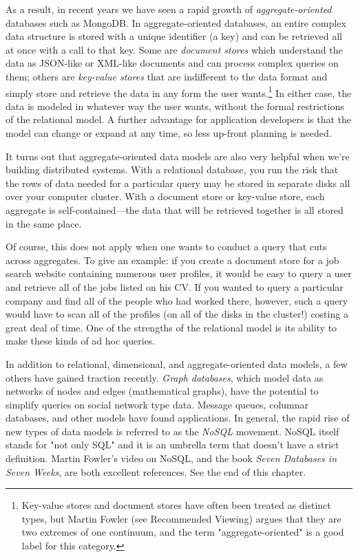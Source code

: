 \documentclass[11pt]{book}
\newcommand{\term}[1]{\emph{#1}} %
\begin{document}
As a result, in recent years we have seen a rapid growth of \term{aggregate-oriented} databases such as MongoDB.  In aggregate-oriented databases, an entire complex data structure is stored with a unique identifier (a key) and can be retrieved all at once with a call to that key.  Some are \term{document stores} which understand the data as JSON-like or XML-like documents and can process complex queries on them; others are \term{key-value stores} that are indifferent to the data format and simply store and retrieve the data in any form the user wants.\footnote{Key-value stores and document stores have often been treated as distinct types, but Martin Fowler (see Recommended Viewing) argues that they are two extremes of one continuum, and the term "aggregate-oriented" is a good label for this category.}  In either case, the data is modeled in whatever way the user wants, without the formal restrictions of the relational model.  A further advantage for application developers is that the model can change or expand at any time, so less up-front planning is needed.

It turns out that aggregate-oriented data models are also very helpful when we're building distributed systems.  With a relational database, you run the risk that the rows of data needed for a particular query may be stored in separate disks all over your computer cluster.  With a document store or key-value store, each aggregate is self-contained---the data that will be retrieved together is all stored in the same place.

Of course, this does not apply when one wants to conduct a query that cuts across aggregates.  To give an example: if you create a document store for a job search website containing numerous user profiles, it would be easy to query a user and retrieve all of the jobs listed on his CV.  If you wanted to query a particular company and find all of the people who had worked there, however, such a query would have to scan all of the profiles (on all of the disks in the cluster!) costing a great deal of time.  One of the strengths of the relational model is its ability to make these kinds of ad hoc queries.

In addition to relational, dimensional, and aggregate-oriented data models, a few others have gained traction recently.  \term{Graph databases}, which model data as networks of nodes and edges (mathematical graphs), have the potential to simplify queries on social network type data.  Message queues, columnar databases, and other models have found applications.  In general, the rapid rise of new types of data models is referred to as the \term{NoSQL} movement.  NoSQL itself stands for "not only SQL" and it is an umbrella term that doesn't have a strict definition. Martin Fowler's video on NoSQL, and the book \textit{Seven Databases in Seven Weeks}, are both excellent references. See the end of this chapter.
\end{document}
